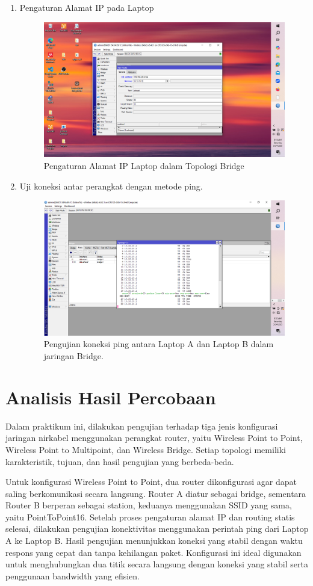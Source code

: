 \begin{enumerate}
    \item Pengaturan Alamat IP pada Laptop
    \begin{figure}[H]
        \centering
        \includegraphics[width=0.5\linewidth]{P3/img/gambar5.png}
        \caption{Pengaturan Alamat IP Laptop dalam Topologi Bridge}
        \label{fig:ip-laptop-bridge}
    \end{figure}
    
    \item Uji koneksi antar perangkat dengan metode ping.
    \begin{figure}[H]
        \centering
        \includegraphics[width=0.5\linewidth]{P3/img/ping3.png}
        \caption{Pengujian koneksi ping antara Laptop A dan Laptop B dalam jaringan Bridge.}
        \label{fig:ping-bridge}
    \end{figure}
\end{enumerate}



\section{Analisis Hasil Percobaan}
Dalam praktikum ini, dilakukan pengujian terhadap tiga jenis konfigurasi jaringan nirkabel menggunakan perangkat router, yaitu Wireless Point to Point, Wireless Point to Multipoint, dan Wireless Bridge. Setiap topologi memiliki karakteristik, tujuan, dan hasil pengujian yang berbeda-beda.

Untuk konfigurasi Wireless Point to Point, dua router dikonfigurasi agar dapat saling berkomunikasi secara langsung. Router A diatur sebagai bridge, sementara Router B berperan sebagai station, keduanya menggunakan SSID yang sama, yaitu PointToPoint16. Setelah proses pengaturan alamat IP dan routing statis selesai, dilakukan pengujian konektivitas menggunakan perintah ping dari Laptop A ke Laptop B. Hasil pengujian menunjukkan koneksi yang stabil dengan waktu respons yang cepat dan tanpa kehilangan paket. Konfigurasi ini ideal digunakan untuk menghubungkan dua titik secara langsung dengan koneksi yang stabil serta penggunaan bandwidth yang efisien.

